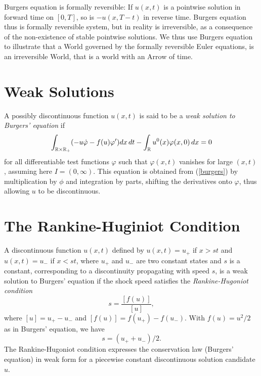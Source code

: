 Burgers equation is formally reversible: If $u(x,t)$ is a 
pointwise solution in forward time on $[0,T]$, 
so is $-u(x,T-t)$ in reverse time. Burgers equation 
thus is formally reversible system, but in reality is irreversible, 
as a consequence of the non-existence of stable pointwise solutions. 
We thus use Burgers equation to illustrate that a World governed 
by the formally reversible Euler equations, is an irreversible
World, that is a world with an Arrow of time.




\section{Weak Solutions} 

A possibly
discontinuous function $u(x,t)$ is said to be a \emph{weak
solution to Burgers' 
equation} if 
\begin{equation}\label{burgersweak}\int_{{\mathbb{R}}\times{\mathbb{R}}_+} (-u\dot\varphi -f(u)\varphi^\prime )dx\, dt-
\int_{\mathbb{R}} u^0(x)\varphi (x,0)\, dx =0
\end{equation}
for all differentiable test functions $\varphi$ such that
$\varphi (x,t)$ vanishes for large $(x,t)$, assuming here
$I=(0,\infty )$.
This equation is obtained from (\ref{burgers}) by multiplication by
$\phi$ and integration by parts, shifting the derivatives
onto $\varphi$, thus allowing $u$ to be discontinuous. 




\section{The Rankine-Huginiot Condition}

A discontinuous function $u(x,t)$ defined by $u(x,t)=u_+$ if $x>st$ and 
$u(x,t)=u_-$ if $x<st$, where  $u_+$ and $u_-$ are two constant
states and $s$ is a constant, corresponding to a discontinuity 
propagating with speed $s$, is a weak solution
to Burgers' equation if the shock speed satisfies the 
\emph{Rankine-Hugoniot condition}
\begin{equation}\label{rh}
s=\frac{[f(u)]}{[u]},
\end{equation}
where $[u]=u_+-u_-$ and $[f(u)]=f(u_+ )-f(u_- )$. With $f(u)=u^2/2$
as in Burgers' equation, we have 
\begin{equation}\label{rhburgers}
s=(u_++u_-)/2.
\end{equation}
The Rankine-Hugoniot condition expresses the conservation law
(Burgers' equation)
in weak form for a piecewise constant discontinuous solution candidate $u$.


